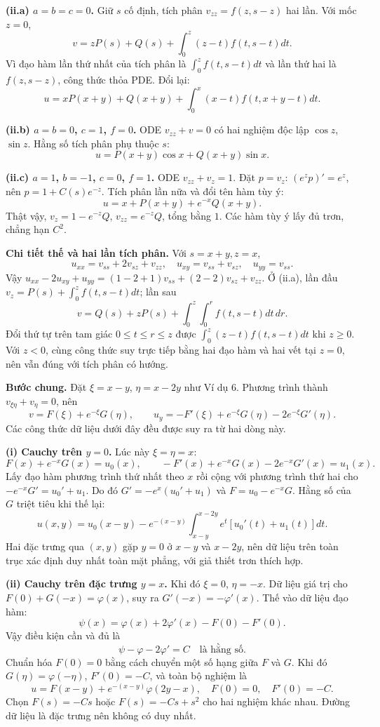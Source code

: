 \textbf{(ii.a) $a=b=c=0$.} Giữ $s$ cố định, tích phân $v_{zz}=f(z,s-z)$ hai lần. Với mốc $z=0$,
\[v=zP(s)+Q(s)+\int_0^z(z-t)f(t,s-t)dt.\]
Vì đạo hàm lần thứ nhất của tích phân là $\int_0^z f(t,s-t)dt$ và lần thứ hai là $f(z,s-z)$, công thức thỏa PDE. Đổi lại:
\[u=xP(x+y)+Q(x+y)+\int_0^x(x-t)f(t,x+y-t)dt.\]

\textbf{(ii.b) $a=b=0$, $c=1$, $f=0$.} ODE $v_{zz}+v=0$ có hai nghiệm độc lập $\cos z$, $\sin z$. Hằng số tích phân phụ thuộc $s$:
\[\boxed{u=P(x+y)\cos x+Q(x+y)\sin x.}\]

\textbf{(ii.c) $a=1$, $b=-1$, $c=0$, $f=1$.} ODE $v_{zz}+v_z=1$. Đặt $p=v_z$: $(e^zp)'=e^z$, nên $p=1+C(s)e^{-z}$. Tích phân lần nữa và đổi tên hàm tùy ý:
\[\boxed{u=x+P(x+y)+e^{-x}Q(x+y).}\]
Thật vậy, $v_z=1-e^{-z}Q$, $v_{zz}=e^{-z}Q$, tổng bằng $1$. Các hàm tùy ý lấy đủ trơn, chẳng hạn $C^2$.

\textbf{Chi tiết thế và hai lần tích phân.} Với $s=x+y,z=x$,
\[u_{xx}=v_{ss}+2v_{sz}+v_{zz},\quad u_{xy}=v_{ss}+v_{sz},\quad u_{yy}=v_{ss}.\]
Vậy $u_{xx}-2u_{xy}+u_{yy}=(1-2+1)v_{ss}+(2-2)v_{sz}+v_{zz}$. Ở (ii.a), lần đầu $v_z=P(s)+\int_0^zf(t,s-t)dt$; lần sau
\[v=Q(s)+zP(s)+\int_0^z\int_0^r f(t,s-t)dt\,dr.\]
Đổi thứ tự trên tam giác $0\le t\le r\le z$ được $\int_0^z(z-t)f(t,s-t)dt$ khi $z\ge0$. Với $z<0$, cùng công thức suy trực tiếp bằng hai đạo hàm và hai vết tại $z=0$, nên vẫn đúng với tích phân có hướng.

\textbf{Bước chung.} Đặt $\xi=x-y$, $\eta=x-2y$ như Ví dụ 6. Phương trình thành $v_{\xi\eta}+v_\eta=0$, nên
\[v=F(\xi)+e^{-\xi}G(\eta),\qquad
u_y=-F'(\xi)+e^{-\xi}G(\eta)-2e^{-\xi}G'(\eta).\]
Các công thức dữ liệu dưới đây đều được suy ra từ hai dòng này.

\textbf{(i) Cauchy trên $y=0$.} Lúc này $\xi=\eta=x$:
\[F(x)+e^{-x}G(x)=u_0(x),\qquad
-F'(x)+e^{-x}G(x)-2e^{-x}G'(x)=u_1(x).\]
Lấy đạo hàm phương trình thứ nhất theo $x$ rồi cộng với phương trình thứ hai cho $-e^{-x}G'=u_0'+u_1$. Do đó $G'=-e^x(u_0'+u_1)$ và $F=u_0-e^{-x}G$. Hằng số của $G$ triệt tiêu khi thế lại:
\[\boxed{u(x,y)=u_0(x-y)-e^{-(x-y)}\int_{x-y}^{x-2y}e^t[u_0'(t)+u_1(t)]dt.}\]
Hai đặc trưng qua $(x,y)$ gặp $y=0$ ở $x-y$ và $x-2y$, nên dữ liệu trên toàn trục xác định duy nhất toàn mặt phẳng, với giả thiết trơn thích hợp.

\textbf{(ii) Cauchy trên đặc trưng $y=x$.} Khi đó $\xi=0$, $\eta=-x$. Dữ liệu giá trị cho $F(0)+G(-x)=\varphi(x)$, suy ra $G'(-x)=-\varphi'(x)$. Thế vào dữ liệu đạo hàm:
\[\psi(x)=\varphi(x)+2\varphi'(x)-F(0)-F'(0).\]
Vậy điều kiện cần và đủ là
\[\boxed{\psi-\varphi-2\varphi'=C\quad\text{là hằng số}.}\]
Chuẩn hóa $F(0)=0$ bằng cách chuyển một số hạng giữa $F$ và $G$. Khi đó $G(\eta)=\varphi(-\eta)$, $F'(0)=-C$, và toàn bộ nghiệm là
\[u=F(x-y)+e^{-(x-y)}\varphi(2y-x),\quad F(0)=0,\quad F'(0)=-C.\]
Chọn $F(s)=-Cs$ hoặc $F(s)=-Cs+s^2$ cho hai nghiệm khác nhau. Đường dữ liệu là đặc trưng nên không có duy nhất.

